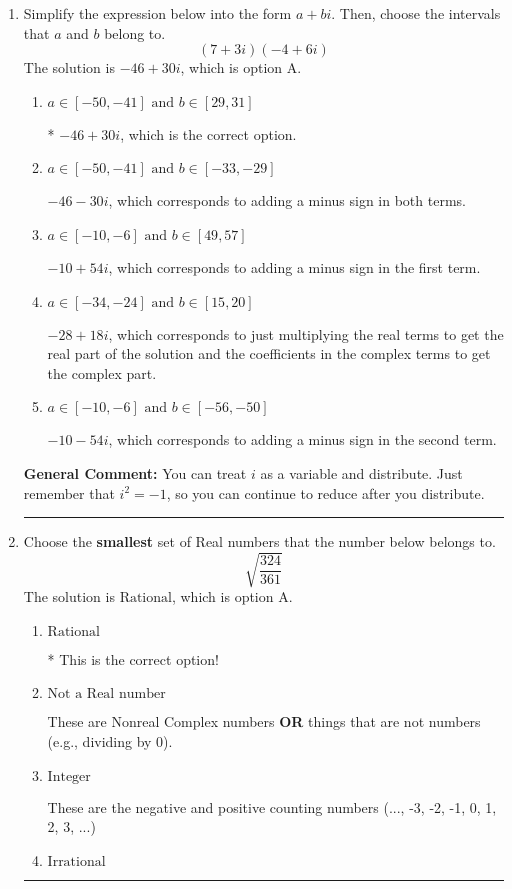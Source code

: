 \documentclass{extbook}[14pt]
\newcommand{\litem}[1]{\item #1

\rule{\textwidth}{0.4pt}}
\begin{document}
\begin{enumerate}
{ Irrational numbers are more than just square root of 3: adding or subtracting values from square root of 3 is also irrational.
}
\litem{
Simplify the expression below into the form $a+bi$. Then, choose the intervals that $a$ and $b$ belong to.
\[ (7 + 3 i)(-4 + 6 i) \]The solution is \( -46 + 30 i \), which is option A.\begin{enumerate}[label=\Alph*.]
\item \( a \in [-50, -41] \text{ and } b \in [29, 31] \)

* $-46 + 30 i$, which is the correct option.
\item \( a \in [-50, -41] \text{ and } b \in [-33, -29] \)

 $-46 - 30 i$, which corresponds to adding a minus sign in both terms.
\item \( a \in [-10, -6] \text{ and } b \in [49, 57] \)

 $-10 + 54 i$, which corresponds to adding a minus sign in the first term.
\item \( a \in [-34, -24] \text{ and } b \in [15, 20] \)

 $-28 + 18 i$, which corresponds to just multiplying the real terms to get the real part of the solution and the coefficients in the complex terms to get the complex part.
\item \( a \in [-10, -6] \text{ and } b \in [-56, -50] \)

 $-10 - 54 i$, which corresponds to adding a minus sign in the second term.
\end{enumerate}

\textbf{General Comment:} You can treat $i$ as a variable and distribute. Just remember that $i^2=-1$, so you can continue to reduce after you distribute.
}
\litem{
Choose the \textbf{smallest} set of Real numbers that the number below belongs to.
\[ \sqrt{\frac{324}{361}} \]The solution is \( \text{Rational} \), which is option A.\begin{enumerate}[label=\Alph*.]
\item \( \text{Rational} \)

* This is the correct option!
\item \( \text{Not a Real number} \)

These are Nonreal Complex numbers \textbf{OR} things that are not numbers (e.g., dividing by 0).
\item \( \text{Integer} \)

These are the negative and positive counting numbers (..., -3, -2, -1, 0, 1, 2, 3, ...)
\item \( \text{Irrational} \)


\end{enumerate}}
\end{enumerate}
\end{document}

